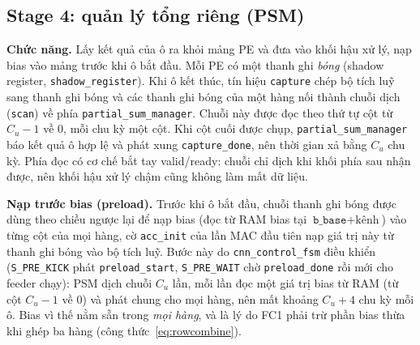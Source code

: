 \subsection{Stage 4: quản lý tổng riêng (PSM)}
\textbf{Chức năng.} Lấy kết quả của ô ra khỏi mảng PE và đưa vào khối hậu xử lý, nạp bias vào mảng trước khi ô bắt đầu.
Mỗi PE có một thanh ghi \emph{bóng} (shadow register, \texttt{shadow\_register}). Khi ô kết thúc, tín hiệu \texttt{capture} chép bộ tích luỹ sang thanh ghi bóng và các thanh ghi bóng của một hàng nối thành chuỗi dịch (\texttt{scan}) về phía \texttt{partial\_sum\_manager}.
Chuỗi này được đọc theo thứ tự cột từ $C_u-1$ về $0$, mỗi chu kỳ một cột. Khi cột cuối được chụp, \texttt{partial\_sum\_manager} báo kết quả ô hợp lệ và phát xung \texttt{capture\_done}, nên thời gian xả bằng $C_u$ chu kỳ.
Phía đọc có cơ chế bắt tay valid/ready: chuỗi chỉ dịch khi khối phía sau nhận được, nên khối hậu xử lý chậm cũng không làm mất dữ liệu.

\textbf{Nạp trước bias (preload).} Trước khi ô bắt đầu, chuỗi thanh ghi bóng được dùng theo chiều ngược lại để nạp bias (đọc từ RAM bias tại $\texttt{b\_base}+\text{kênh}$) vào từng cột của mọi hàng, cờ \texttt{acc\_init} của lần MAC đầu tiên nạp giá trị này từ thanh ghi bóng vào bộ tích luỹ.
Bước này do \texttt{cnn\_control\_fsm} điều khiển (\texttt{S\_PRE\_KICK} phát \texttt{preload\_start}, \texttt{S\_PRE\_WAIT} chờ \texttt{preload\_done} rồi mới cho feeder chạy): PSM dịch chuỗi $C_u$ lần, mỗi lần đọc một giá trị bias từ RAM (từ cột $C_u-1$ về $0$) và phát chung cho mọi hàng, nên mất khoảng $C_u+4$ chu kỳ mỗi ô.
Bias vì thế nằm sẵn trong \emph{mọi hàng}, và là lý do FC1 phải trừ phần bias thừa khi ghép ba hàng (công thức~\eqref{eq:rowcombine}).

